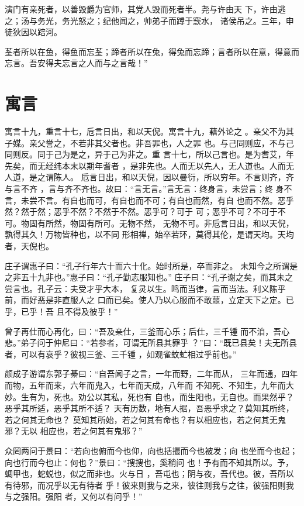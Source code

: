 \documentclass[a4paper,12pt,UTF8,twoside]{ctexbook}
\begin{document}
演门有亲死者，以善毁爵为官师，其党人毁而死者半。尧与许由天 下，许由逃之；汤与务光，务光怒之；纪他闻之，帅弟子而蹲于窾水， 诸侯吊之。三年，申徒狄因以踣河。

荃者所以在鱼，得鱼而忘荃；蹄者所以在兔，得兔而忘蹄；言者所以在意，得意而忘言。吾安得夫忘言之人而与之言哉！”
\section{寓言}

寓言十九，重言十七，卮言日出，和以天倪。寓言十九，藉外论之 。亲父不为其子媒。亲父誉之，不若非其父者也。非吾罪也，人之罪 也。与己同则应，不与己同则反。同于己为是之，异于己为非之。重 言十七，所以己言也。是为耆艾，年先矣，而无经纬本末以期年耆者 ，是非先也。人而无以先人，无人道也。人而无人道，是之谓陈人。 卮言日出，和以天倪，因以曼衍，所以穷年。不言则齐，齐与言不齐 ，言与齐不齐也。故曰：“言无言。”言无言：终身言，未尝言；终 身不言，未尝不言。有自也而可，有自也而不可；有自也而然，有自 也而不然。恶乎然？然于然；恶乎不然？不然于不然。恶乎可？可于 可；恶乎不可？不可于不可。物固有所然，物固有所可。无物不然， 无物不可。非卮言日出，和以天倪，孰得其久！万物皆种也，以不同 形相禅，始卒若环，莫得其伦，是谓天均。天均者，天倪也。

庄子谓惠子曰：“孔子行年六十而六十化。始时所是，卒而非之。 未知今之所谓是之非五十九非也。”惠子曰：“孔子勤志服知也。” 庄子曰：“孔子谢之矣，而其未之尝言也。孔子云：夫受才乎大本， 复灵以生。鸣而当律，言而当法。利义陈乎前，而好恶是非直服人之 口而已矣。使人乃以心服而不敢蘁，立定天下之定。已乎，已乎！吾 且不得及彼乎！”

曾子再仕而心再化，曰：“吾及亲仕，三釜而心乐；后仕，三千锺 而不洎，吾心悲。”弟子问于仲尼曰：“若参者，可谓无所县其罪乎 ？”曰：“既已县矣！夫无所县者，可以有哀乎？彼视三釜、三千锺 ，如观雀蚊虻相过乎前也。”

颜成子游谓东郭子綦曰：“自吾闻子之言，一年而野，二年而从， 三年而通，四年而物，五年而来，六年而鬼入，七年而天成，八年而 不知死、不知生，九年而大妙。生有为，死也。劝公以其私，死也有 自也，而生阳也，无自也。而果然乎？恶乎其所适，恶乎其所不适？ 天有历数，地有人据，吾恶乎求之？莫知其所终，若之何其无命也？ 莫知其所始，若之何其有命也？有以相应也，若之何其无鬼邪？无以 相应也，若之何其有鬼邪？”

众罔两问于景曰：“若向也俯而今也仰，向也括撮而今也被发；向 也坐而今也起；向也行而今也止：何也？”景曰：“搜搜也，奚稍问 也！予有而不知其所以。予，蜩甲也，蛇蜕也，似之而非也。火与日 ，吾屯也；阴与夜，吾代也。彼，吾所以有待邪，而况乎以无有待者 乎！彼来则我与之来，彼往则我与之往，彼强阳则我与之强阳。强阳 者，又何以有问乎！”
\end{document}
